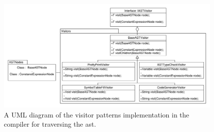 \begin{figure}[!ht]
\centering
 \includegraphics[width=1\textwidth]{figures/ClassDiagrams/Visitors.pdf} %
\caption{A UML diagram of the visitor patterns implementation in the compiler for traversing the \acrshort{ast}.}\label{image:Visitors}
\vspace{-15pt}
\end{figure} 